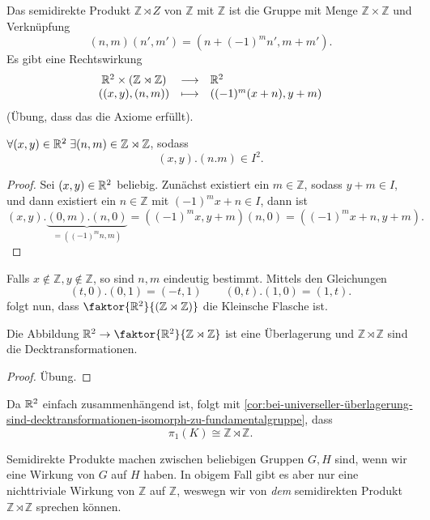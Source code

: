 \begin{nexample}\label{ex:fundamentalgruppe-der-kleinschen-flasche-mittels-semidirektem-produkt-z-z}
    Das semidirekte Produkt $\mathbb{Z} \rtimes Z$ von $\mathbb{Z}$ mit $\mathbb{Z}$ ist die Gruppe mit Menge $\mathbb{Z}\times \mathbb{Z}$ und Verknüpfung
    \[
        (n,m)(n',m') = (n+(-1)^m n', m + m')
    .\] 
    Es gibt eine Rechtswirkung
        \begin{equation*}
        \begin{array}{c c l} 
            \mathbb{R}^2\times (\mathbb{Z}\rtimes \mathbb{Z}) & \longrightarrow & \mathbb{R}^2 \\
            ((x,y),(n,m)) & \longmapsto &  ((-1)^m(x+n),y+m)
        \end{array}
    \end{equation*}
    (Übung, dass das die Axiome erfüllt).
    \begin{claim*}
        $\forall (x,y) \in \mathbb{R}^2 \; \exists (n,m) \in \mathbb{Z}\rtimes \mathbb{Z}$, sodass
        \[
            (x,y).(n.m) \in I^2
        .\] 
    \end{claim*}
    \begin{proof}
        Sei $(x,y) \in \mathbb{R}^2$ beliebig. Zunächst existiert ein $m\in \mathbb{Z}$, sodass $y + m \in I$, und dann existiert ein $n\in \mathbb{Z}$ mit $(-1)^m x + n\in I$, dann ist
        \[
            (x,y) . \underbrace{(0,m).(n,0)}_{=((-1)^mn, m)} = ((-1)^mx, y+m)(n,0) = ((-1)^mx + n, y+m)
        .\] 
    \end{proof}
        Falls $x\not\in \mathbb{Z}, y\not\in \mathbb{Z}$, so sind $n,m$ eindeutig bestimmt. Mittels den Gleichungen
        \[
            (t,0).(0,1) = (-t,1) \qquad (0,t).(1,0) = (1,t)
        .\] 
        folgt nun, dass $\faktor{\R^2}{(\mathbb{Z} \rtimes \mathbb{Z})}$ die Kleinsche Flasche ist.
        \begin{claim*}
            Die Abbildung $\R^2 \to  \faktor{\R^2}{\mathbb{Z} \rtimes \mathbb{Z}}$ ist eine Überlagerung und $\mathbb{Z} \rtimes \mathbb{Z}$ sind die Decktransformationen.
        \end{claim*}
        \begin{proof}
            Übung.
        \end{proof}
        Da $\mathbb{R}^2$ einfach zusammenhängend ist, folgt mit \autoref{cor:bei-universeller-überlagerung-sind-decktransformationen-isomorph-zu-fundamentalgruppe}, dass
        \[
            \pi_1(K) \cong \mathbb{Z} \rtimes \mathbb{Z}
        .\] 
\end{nexample}

\begin{oral}
    Semidirekte Produkte machen zwischen beliebigen Gruppen $G, H$ sind, wenn wir eine Wirkung von $G$ auf  $H$ haben. In obigem Fall gibt es aber nur eine nichttriviale Wirkung von  $\mathbb{Z}$ auf $\mathbb{Z}$, weswegn wir von \textit{dem} semidirekten Produkt $\mathbb{Z} \rtimes \mathbb{Z}$ sprechen können. 
\end{oral}
